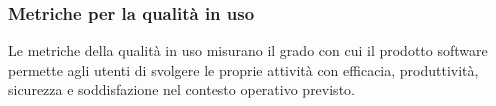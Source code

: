 \documentclass[../PianoDiQualifica.tex]{subfiles}
\begin{document}
\begin{appendices}
	\subsubsection{Metriche per la qualità in uso}
	Le metriche della qualità in uso misurano il grado con cui il prodotto software permette agli utenti di svolgere le proprie attività con efficacia, produttività, sicurezza e soddisfazione nel contesto operativo previsto.
	
\end{appendices}
\end{document}

